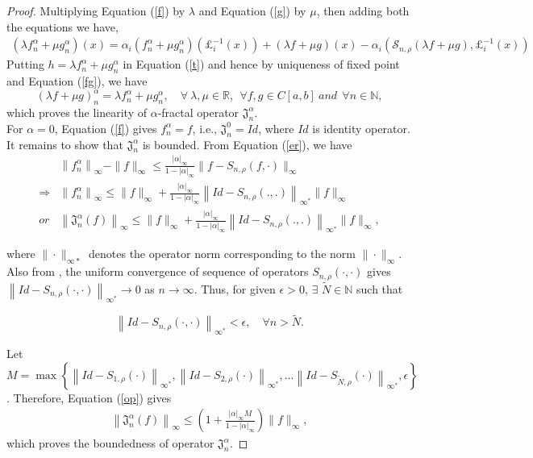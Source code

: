 \documentclass{article}[12pt, a4]
\begin{document}
\begin{proof}
		
		Multiplying Equation (\ref{f}) by $\lambda$ and Equation (\ref{g}) by $\mu$, then adding both the equations we have,
		\begin{align}\label{fg}
			(\lambda f_{n}^{\alpha}+\mu g_{n}^{\alpha})(x)=\alpha_{i}(f_{n}^{\alpha}+\mu g_{n}^{\alpha})(\pounds_{i}^{-1}(x))+(\lambda f+\mu g)(x)-\alpha_{i}(\mathcal{S}_{n,\rho}(\lambda f+\mu g), \pounds_{i}^{-1}(x))
		\end{align}
		Putting $h=\lambda f_{n}^{\alpha}+\mu g_{n}^{\alpha}$ in Equation (\ref{t}) and hence by uniqueness of fixed point and Equation (\ref{fg}), we have 
		\begin{equation*}
			(\lambda f+\mu g)_{n}^{\alpha}=\lambda f_{n}^{\alpha}+\mu g_{n}^{\alpha}, \quad \forall~ \lambda, \mu \in \mathbb{R},~~ \forall f,g \in C[a,b] ~ and ~~ \forall n \in \mathbb{N},
		\end{equation*}
		which proves the linearity of $\alpha$-fractal operator $\mathfrak{J}_{n}^{\alpha}$.\\
		For $\alpha=0$, Equation (\ref{f}) gives $f_{n}^{\alpha}=f$, i.e., $\mathfrak{J}_{n}^{0}=Id$, where $Id$ is identity operator.\\
		It remains to show that $\mathfrak{J}_{n}^{\alpha}$ is bounded. From Equation (\ref{er}), we have 
		\begin{align}\label{op}
			&\left\|f_{n}^{\alpha}\right\|_{\infty}-\|f\|_{\infty}\leq\frac{|\alpha|_{\infty}}{1-|\alpha|_{\infty}}\|f-S_{n,\rho}(f, \cdot)\|_{\infty} \nonumber\\
			\Rightarrow&\left\|f_{n}^{\alpha}\right\|_{\infty} \leq\|f\|_{\infty}+\frac{|\alpha|_{\infty}}{1-|\alpha|_{\infty}}\left\|Id-S_{n,\rho}(., .)\right\|_{\infty^{*}}\|f\|_{\infty} \nonumber\\
			or & \left\|\mathfrak{J}_{n}^{\alpha}(f)\right\|_{\infty} \leq\|f\|_{\infty}+\frac{|\alpha|_{\infty}}{1-|\alpha|_{\infty}}\left\|Id-S_{n,\rho}(., .)\right\|_{\infty^{*}}\|f\|_{\infty},
		\end{align}
		
		
		where \( \|\cdot\|_{\infty *} \) denotes the operator norm corresponding to the norm \( \|\cdot\|_{\infty} \).
		Also from \cite{QIAN2022126781}, the uniform convergence of sequence of operators $S_{n,\rho}(\cdot, \cdot)$ gives $\left\|Id-S_{n,\rho}(\cdot, \cdot)\right\|_{\infty^{*}} \rightarrow 0$ as $n \rightarrow \infty$. Thus, for given $\epsilon>0$, $\exists$ $\tilde{N} \in \mathbb{N}$ such that
		
		$$
		\left\|Id-S_{n,\rho}(\cdot, \cdot)\right\|_{\infty^{*}}<\epsilon, \quad \forall n>\tilde{N} .
		$$
		
		Let $M=\max \left\{\left\|Id-S_{1,\rho}(\cdot)\right\|_{\infty^{*}},\left\|Id-S_{2,\rho}(\cdot)\right\|_{\infty^{*}}, \ldots\left\|Id-S_{\tilde{N},\rho}(\cdot)\right\|_{\infty^{*}}, \epsilon\right\}$. Therefore, Equation (\ref{op}) gives
		\begin{align*}
			\left\|\mathfrak{J}_{n}^{\alpha}(f)\right\|_{\infty} \leq \left(1+\frac{|\alpha|_{\infty} M}{1-|\alpha|_{\infty}}\right)\|f\|_{\infty},
		\end{align*}
		which proves the boundedness of operator $\mathfrak{J}_{n}^{\alpha}$.
	\end{proof}
\end{document}
